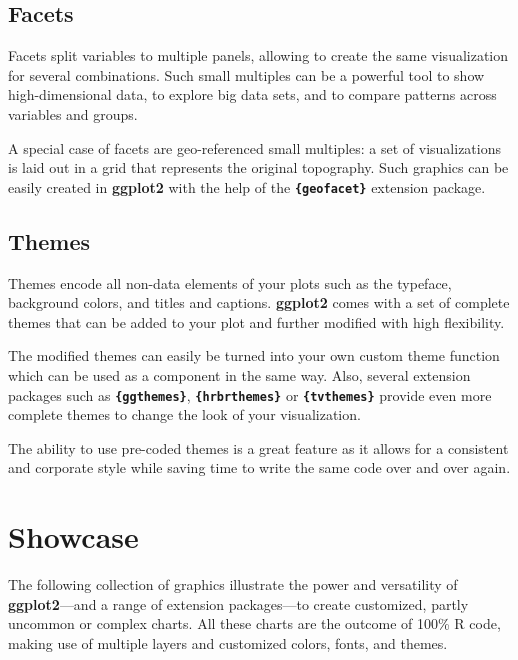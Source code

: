 \documentclass[
]{krantz}
\begin{document}
\hypertarget{facets}{%
\subsection{Facets}\label{facets}}

Facets split variables to multiple panels, allowing to create the same visualization for several combinations. Such small multiples can be a powerful tool to show high-dimensional data, to explore big data sets, and to compare patterns across variables and groups.

A special case of facets are geo-referenced small multiples: a set of visualizations is laid out in a grid that represents the original topography. Such graphics can be easily created in \textbf{ggplot2} with the help of the \textbf{\texttt{\{geofacet\}}} extension package.

\hypertarget{themes}{%
\subsection{Themes}\label{themes}}

Themes encode all non-data elements of your plots such as the typeface, background colors, and titles and captions. \textbf{ggplot2} comes with a set of complete themes that can be added to your plot and further modified with high flexibility.

The modified themes can easily be turned into your own custom theme function which can be used as a component in the same way. Also, several extension packages such as \textbf{\texttt{\{ggthemes\}}}, \textbf{\texttt{\{hrbrthemes\}}} or \textbf{\texttt{\{tvthemes\}}} provide even more complete themes to change the look of your visualization.

The ability to use pre-coded themes is a great feature as it allows for a consistent and corporate style while saving time to write the same code over and over again.

\hypertarget{showcase}{%
\section{Showcase}\label{showcase}}

The following collection of graphics illustrate the power and versatility of \textbf{ggplot2}---and a range of extension packages---to create customized, partly uncommon or complex charts. All these charts are the outcome of 100\% R code, making use of multiple layers and customized colors, fonts, and themes.
\end{document}
